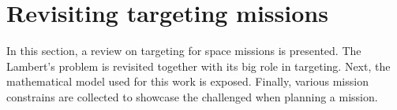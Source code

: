 \chapter{Revisiting targeting missions}

In this section, a review on targeting for space missions is presented. The
Lambert's problem is revisited together with its big role in targeting. Next,
the mathematical model used for this work is exposed. Finally, various mission
constrains are collected to showcase the challenged when planning a mission.



